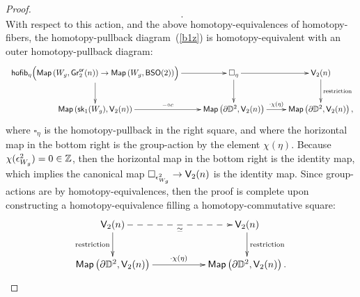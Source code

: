 \begin{proof}
\[~.
\]
With respect to this action, and the above homotopy-equivalences of homotopy-fibers, the homotopy-pullback diagram~(\ref{b1z}) is homotopy-equivalent with an outer homotopy-pullback diagram:
\begin{equation}
\label{b1z'}
\resizebox{40em}{!}{
\xymatrix{
{\sf hofib}_{\eta} \Bigl(
\Map\left( W_g , \Gr^{\sf or}_2(n) \right) 
\to
\Map\left( W_g , {\sf BSO}(2) \right) 
\Bigr)
\ar[r]
\ar[d]
&
\square_\eta
\ar[r]
\ar[d] 
&
\sV_2(n)
\ar[d]^-{\rm restriction}
\\
\Map\left( \sk_1(W_g) , \sV_2(n) \right) 
\ar[r]^-{-\circ c}
&
\Map\left(  \partial \DD^2, \sV_2(n) \right) 
\ar[r]^-{\cdot \chi(\eta)}
&
\Map\left( \partial \DD^2 , \sV_2(n) \right) 
,
}
}
\end{equation}
where $\square_\eta$ is the homotopy-pullback in the right square, and where the horizontal map in the bottom right is the group-action by the element $\chi(\eta)$.
Because $\chi(\epsilon^2_{W_g}) = 0\in \mathbb Z$, then the horizontal map in the bottom right is the identity map, which implies the canonical map $\square_{\epsilon^2_{W_g}} \to \mathsf V_2(n)$ is the identity map.
Since group-actions are by homotopy-equivalences, then 
the proof is complete upon constructing a homotopy-equivalence filling a homotopy-commutative square:
\begin{equation}
\label{b4z}
\xymatrix{
\sV_2(n)
\ar@{-->}[rr]_-{\simeq}
\ar[d]_-{\rm restriction}
&&
\sV_2(n)
\ar[d]^-{\rm restriction}
\\
\Map\left(  \partial \DD^2, \sV_2(n) \right) 
\ar[rr]^-{\cdot \chi(\eta)}
&&
\Map\left( \partial \DD^2 , \sV_2(n) \right) 
.
}
\end{equation}





\end{proof}
